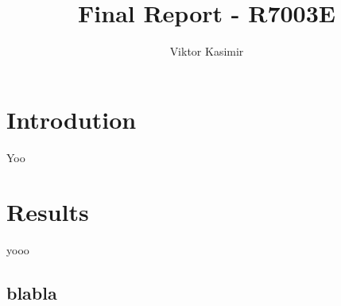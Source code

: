 \documentclass[10pt,a4paper]{report}
\author{Viktor Kasimir}
\title{Final Report - R7003E}
\begin{document}
\maketitle

\section{Introdution}
Yoo

\section{Results}
yooo 

\subsection{blabla}
\end{document}
